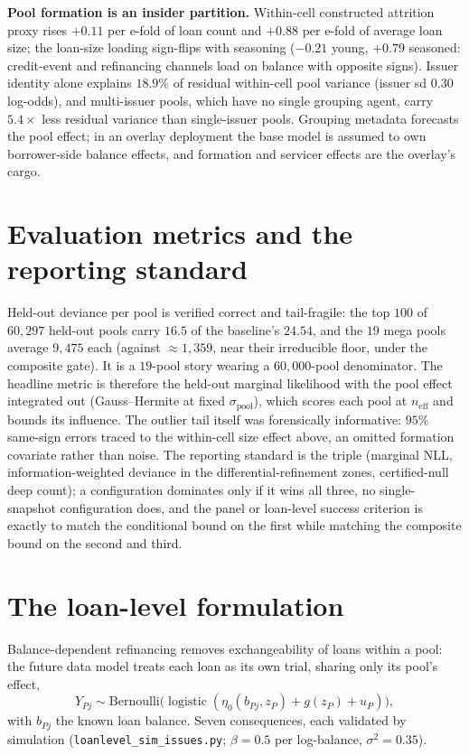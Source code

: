 \documentclass[11pt]{article}
\begin{document}
\textbf{Pool formation is an insider partition.} Within-cell constructed attrition proxy
rises $+0.11$ per e-fold of loan count and $+0.88$ per e-fold of average
loan size; the loan-size loading sign-flips with seasoning ($-0.21$ young,
$+0.79$ seasoned: credit-event and refinancing channels load on balance
with opposite signs). Issuer identity alone explains $18.9\%$ of residual
within-cell pool variance (issuer sd $0.30$ log-odds), and multi-issuer
pools, which have no single grouping agent, carry $5.4\times$ less
residual variance than single-issuer pools. Grouping metadata forecasts
the pool effect; in an overlay deployment the base model is assumed to own
borrower-side balance effects, and formation and servicer effects are the
overlay's cargo.

\section{Evaluation metrics and the reporting standard}\label{sec:metrics}

Held-out deviance per pool is verified correct and tail-fragile: the top
$100$ of $60{,}297$ held-out pools carry $16.5$ of the baseline's $24.54$,
and the $19$ mega pools average $9{,}475$ each (against ${\approx}1{,}359$,
near their irreducible floor, under the composite gate). It is a
$19$-pool story wearing a $60{,}000$-pool denominator. The headline metric
is therefore the held-out marginal likelihood with the pool effect
integrated out (Gauss--Hermite at fixed $\sigma_{\mathrm{pool}}$), which
scores each pool at $n_{\mathrm{eff}}$ and bounds its influence. The
outlier tail itself was forensically informative: $95\%$ same-sign errors
traced to the within-cell size effect above, an omitted formation
covariate rather than noise. The reporting standard is the triple
(marginal NLL, information-weighted deviance in the differential-refinement
zones, certified-null deep count); a configuration dominates only if it
wins all three, no single-snapshot configuration does, and the panel or
loan-level success criterion is exactly to match the conditional bound on
the first while matching the composite bound on the second and third.


\section{The loan-level formulation}\label{sec:loanlevel}

Balance-dependent refinancing removes exchangeability of loans within a
pool: the future data model treats each loan as its own trial, sharing
only its pool's effect,
\[
Y_{Pj}\sim\mathrm{Bernoulli}\bigl(\operatorname{logistic}(\eta_0(b_{Pj},z_P)
+ g(z_P) + u_P)\bigr),
\]
with $b_{Pj}$ the known loan balance. Seven consequences, each validated
by simulation (\texttt{loanlevel\_sim\_issues.py}; $\beta=0.5$ per
log-balance, $\sigma^2=0.35$).
\end{document}
